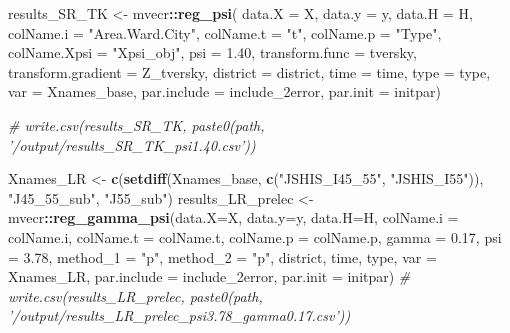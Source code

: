\documentclass[
]{article}
\newenvironment{Shaded}{\begin{snugshade}}{\end{snugshade}}
\newcommand{\CommentTok}[1]{\textcolor[rgb]{0.56,0.35,0.01}{\textit{#1}}}
\newcommand{\DataTypeTok}[1]{\textcolor[rgb]{0.13,0.29,0.53}{#1}}
\newcommand{\FloatTok}[1]{\textcolor[rgb]{0.00,0.00,0.81}{#1}}
\newcommand{\KeywordTok}[1]{\textcolor[rgb]{0.13,0.29,0.53}{\textbf{#1}}}
\newcommand{\NormalTok}[1]{#1}
\newcommand{\OperatorTok}[1]{\textcolor[rgb]{0.81,0.36,0.00}{\textbf{#1}}}
\newcommand{\StringTok}[1]{\textcolor[rgb]{0.31,0.60,0.02}{#1}}
\begin{document}
\begin{Shaded}
\begin{Highlighting}[]
\NormalTok{results_SR_TK <-}\StringTok{ }\NormalTok{mvecr}\OperatorTok{::}\KeywordTok{reg_psi}\NormalTok{(}
  \DataTypeTok{data.X =}\NormalTok{ X, }\DataTypeTok{data.y =}\NormalTok{ y, }\DataTypeTok{data.H =}\NormalTok{ H,}
  \DataTypeTok{colName.i =} \StringTok{"Area.Ward.City"}\NormalTok{, }\DataTypeTok{colName.t =} \StringTok{"t"}\NormalTok{,  }
  \DataTypeTok{colName.p =} \StringTok{"Type"}\NormalTok{, }\DataTypeTok{colName.Xpsi =} \StringTok{"Xpsi_obj"}\NormalTok{,}
  \DataTypeTok{psi =} \FloatTok{1.40}\NormalTok{, }
  \DataTypeTok{transform.func =}\NormalTok{ tversky, }\DataTypeTok{transform.gradient =}\NormalTok{ Z_tversky,}
  \DataTypeTok{district =}\NormalTok{ district, }\DataTypeTok{time =}\NormalTok{ time, }\DataTypeTok{type =}\NormalTok{ type, }
  \DataTypeTok{var =}\NormalTok{ Xnames_base,}
  \DataTypeTok{par.include =}\NormalTok{ include_2error,}
  \DataTypeTok{par.init =}\NormalTok{ initpar)}

\CommentTok{# write.csv(results_SR_TK, paste0(path, '/output/results_SR_TK_psi1.40.csv'))}


\NormalTok{Xnames_LR <-}\StringTok{ }\KeywordTok{c}\NormalTok{(}\KeywordTok{setdiff}\NormalTok{(Xnames_base, }\KeywordTok{c}\NormalTok{(}\StringTok{"JSHIS_I45_55"}\NormalTok{, }\StringTok{"JSHIS_I55"}\NormalTok{)),}
               \StringTok{"J45_55_sub"}\NormalTok{, }\StringTok{"J55_sub"}\NormalTok{)}
\NormalTok{results_LR_prelec <-}\StringTok{ }\NormalTok{mvecr}\OperatorTok{::}\KeywordTok{reg_gamma_psi}\NormalTok{(}\DataTypeTok{data.X=}\NormalTok{X, }\DataTypeTok{data.y=}\NormalTok{y, }\DataTypeTok{data.H=}\NormalTok{H,}
                            \DataTypeTok{colName.i =}\NormalTok{ colName.i, }
                            \DataTypeTok{colName.t =}\NormalTok{ colName.t,  }
                            \DataTypeTok{colName.p =}\NormalTok{ colName.p,}
                            \DataTypeTok{gamma =} \FloatTok{0.17}\NormalTok{, }\DataTypeTok{psi =} \FloatTok{3.78}\NormalTok{, }
                            \DataTypeTok{method_1 =} \StringTok{"p"}\NormalTok{, }\DataTypeTok{method_2 =} \StringTok{"p"}\NormalTok{, }
\NormalTok{                            district, time, type,}
                            \DataTypeTok{var =}\NormalTok{ Xnames_LR, }
                            \DataTypeTok{par.include =}\NormalTok{ include_2error,}
                            \DataTypeTok{par.init =}\NormalTok{ initpar)}
\CommentTok{# write.csv(results_LR_prelec, paste0(path, '/output/results_LR_prelec_psi3.78_gamma0.17.csv'))}



\end{Highlighting}
\end{Shaded}
\end{document}

